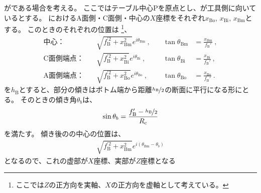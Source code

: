 \clearpage
\Outcut が\CurvedOutcut である場合を考える。
ここではテーブル中心Pを原点とし、\BottomEndFace が工具側に向いているとする。
\EndFace におけるA面側・C面側・中心の$X$座標をそれぞれ$x_\mathrm{Bo}$, $x_\mathrm{Bi}$, $x_\mathrm{Bm}$とする。
このとき\EndFace のそれぞれの位置は
\footnote{ここでは$Z$の正方向を実軸、$X$の正方向を虚軸として考えている。}、
\begin{subequations}
\begin{alignat*}{2}
  \text{中心：}&\quad
  \sqrt{f_\mathrm B^{'2}+x_\mathrm{Bm}^2}e^{i\theta_\mathrm{Bm}}~, \quad &
  \tan\theta_\mathrm{Bm} &= \frac{x_\mathrm{Bm}}{f_\mathrm B'}\ ,\\
  \text{C面側端点：}&\quad
  \sqrt{f_\mathrm B^{'2}+x_\mathrm{Bi}^2}e^{i\theta_\mathrm{Bi}}~, \quad &
  \tan\theta_\mathrm{Bi} &= \frac{x_\mathrm{Bi}}{f_\mathrm B'}\ ,\\
  \text{A面側端点：}&\quad
  \sqrt{f_\mathrm B^{'2}+x_\mathrm{Bo}^2}e^{i\theta_\mathrm{Bo}}~, \quad &
  \tan\theta_\mathrm{Bo} &= \frac{x_\mathrm{Bo}}{f_\mathrm B'}\ .
\end{alignat*}
\end{subequations}
\BottomOutcutLength を$h_\mathrm B$とすると、\nameCurvedOutcut 部分の傾きはボトム端から距離$\nicefrac{h_\mathrm B}2$の断面に平行になる形にとる。
そのときの傾き角$\theta_b$は、
\begin{align*}
  \sin\theta_b = \frac{f_\mathrm B'-\nicefrac{h_\mathrm B}2}{R_\mathrm c}
\end{align*}
を満たす。
傾き後の\nameBottomEndFace の中心の位置は、
\begin{align*}
  \sqrt{f_\mathrm B^{'2}+x_\mathrm{Bm}^2}e^{i(\theta_\mathrm{Bm}-\theta_b)}
\end{align*}
となるので、これの虚部が$X$座標、実部が$Z$座標となる
